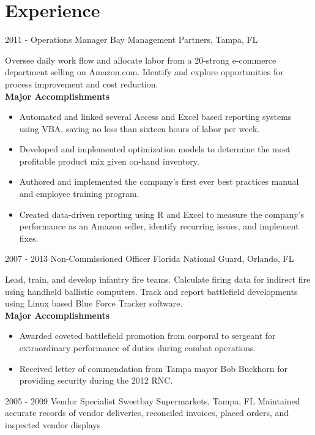 \documentclass[]{friggeri-cv}
\begin{document}
\section{Experience}
\begin{entrylist}
  \entry
    {2011 - }
    {Operations Manager}
    {Bay Management Partners, Tampa, FL}
    {Oversee daily work flow and allocate labor from a 20-strong e-commerce department selling on Amazon.com.  Identify and explore opportunities for process improvement and cost reduction.\\
    \textbf{Major Accomplishments}
    \begin{itemize}
    \item Automated and linked several Access and Excel based reporting systems using VBA, saving no less than sixteen hours of labor per week.
    \item Developed and implemented optimization models to determine the most profitable product mix given on-hand inventory.
    \item Authored and implemented the company's first ever best practices manual and employee training program.
    \item Created data-driven reporting using R and Excel to measure the company's performance as an Amazon seller, identify recurring issues, and implement fixes.
    \end{itemize}
    }
  \entry
    {2007 - 2013}
    {Non-Commissioned Officer}
    {Florida National Guard, Orlando, FL}
    {Lead, train, and develop infantry fire teams.  Calculate firing data for indirect fire using handheld ballistic computers.  Track and report battlefield developments using Linux based Blue Force Tracker software.\\
    \textbf{Major Accomplishments}
    \begin{itemize}
    \item Awarded coveted battlefield promotion from corporal to sergeant for extraordinary performance of duties during combat operations.
    \item Received letter of commendation from Tampa mayor Bob Buckhorn for providing security during the 2012 RNC.
    \end{itemize}
    }
  \entry
    {2005 - 2009}
    {Vendor Specialist}
    {Sweetbay Supermarkets, Tampa, FL}
    {Maintained accurate records of vendor deliveries, reconciled invoices, placed orders, and inspected vendor displays\\}
\end{entrylist}
\end{document}
